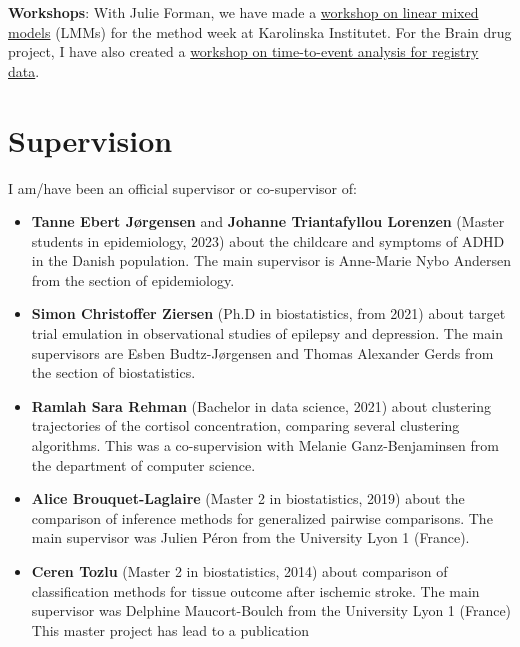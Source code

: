 \documentclass[12pt]{article}
\begin{document}
\medskip

\noindent \textbf{Workshops}: With Julie Forman, we have made a \href{https://github.com/bozenne/bozenne.github.io/tree/master/doc/Teaching/2022-Workshop-LMMstar}{workshop on
linear mixed models} (LMMs) for the method week at Karolinska
Institutet. For the Brain drug project, I have also created a \href{https://github.com/bozenne/bozenne.github.io/tree/master/doc/Teaching/2023-Workshop-Epi}{workshop
on time-to-event analysis for registry data}.


\section{Supervision}
\label{sec:org46ff2e0}

I am/have been an official supervisor or co-supervisor of:
\begin{itemize}
\item \textbf{Tanne Ebert Jørgensen} and \textbf{Johanne Triantafyllou Lorenzen} (Master
students in epidemiology, 2023) about the childcare and symptoms of
ADHD in the Danish population. The main supervisor is Anne-Marie
Nybo Andersen from the section of epidemiology.
\item \textbf{Simon Christoffer Ziersen} (Ph.D in biostatistics, from 2021) about
target trial emulation in observational studies of epilepsy and
depression. The main supervisors are Esben Budtz-Jørgensen and
Thomas Alexander Gerds from the section of biostatistics.
\item \textbf{Ramlah Sara Rehman} (Bachelor in data science, 2021) about clustering
trajectories of the cortisol concentration, comparing several
clustering algorithms. This was a co-supervision with Melanie
Ganz-Benjaminsen from the department of computer science.
\item \textbf{Alice Brouquet-Laglaire} (Master 2 in biostatistics, 2019) about the
comparison of inference methods for generalized pairwise
comparisons. The main supervisor was Julien Péron from the
University Lyon 1 (France).
\item \textbf{Ceren Tozlu} (Master 2 in biostatistics, 2014) about comparison of
classification methods for tissue outcome after ischemic stroke. The
main supervisor was Delphine Maucort-Boulch from the University Lyon
1 (France) This master project has lead to a publication
\citep{tozlu2019comparison}
\end{itemize}

\bigskip
\end{document}

